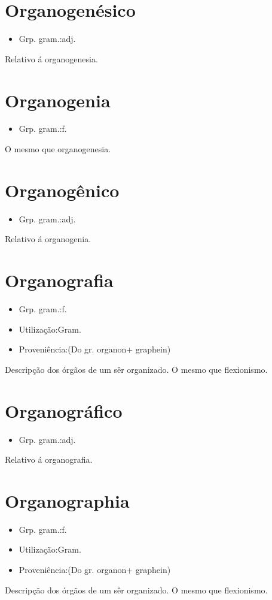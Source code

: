 \section{Organogenésico}
\begin{itemize}
\item {Grp. gram.:adj.}
\end{itemize}
Relativo á organogenesia.
\section{Organogenia}
\begin{itemize}
\item {Grp. gram.:f.}
\end{itemize}
O mesmo que \textunderscore organogenesia\textunderscore .
\section{Organogênico}
\begin{itemize}
\item {Grp. gram.:adj.}
\end{itemize}
Relativo á organogenia.
\section{Organografia}
\begin{itemize}
\item {Grp. gram.:f.}
\end{itemize}
\begin{itemize}
\item {Utilização:Gram.}
\end{itemize}
\begin{itemize}
\item {Proveniência:(Do gr. \textunderscore organon\textunderscore  + \textunderscore graphein\textunderscore )}
\end{itemize}
Descripção dos órgãos de um sêr organizado.
O mesmo que \textunderscore flexionismo\textunderscore .
\section{Organográfico}
\begin{itemize}
\item {Grp. gram.:adj.}
\end{itemize}
Relativo á organografia.
\section{Organographia}
\begin{itemize}
\item {Grp. gram.:f.}
\end{itemize}
\begin{itemize}
\item {Utilização:Gram.}
\end{itemize}
\begin{itemize}
\item {Proveniência:(Do gr. \textunderscore organon\textunderscore  + \textunderscore graphein\textunderscore )}
\end{itemize}
Descripção dos órgãos de um sêr organizado.
O mesmo que \textunderscore flexionismo\textunderscore .

